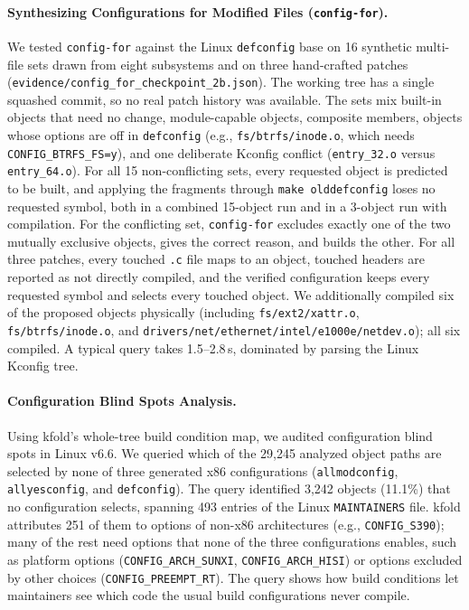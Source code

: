 \documentclass[acmsmall]{acmart}
\newcommand{\tool}{\textsf{kfold}\xspace}
\newcounter{none}
\begin{document}
\paragraph{Synthesizing Configurations for Modified Files (\texttt{config-for}).}
We tested \texttt{config-for} against the Linux \texttt{defconfig} base on 16 synthetic multi-file sets drawn from eight subsystems and on three hand-crafted patches (\texttt{evidence/config\_for\_checkpoint\_2b.json}).
The working tree has a single squashed commit, so no real patch history was available.
The sets mix built-in objects that need no change, module-capable objects, composite members, objects whose options are off in \texttt{defconfig} (e.g., \texttt{fs/btrfs/inode.o}, which needs \texttt{CONFIG\_BTRFS\_FS=y}), and one deliberate Kconfig conflict (\texttt{entry\_32.o} versus \texttt{entry\_64.o}).
For all 15 non-conflicting sets, every requested object is predicted to be built, and applying the fragments through \texttt{make olddefconfig} loses no requested symbol, both in a combined 15-object run and in a 3-object run with compilation.
For the conflicting set, \texttt{config-for} excludes exactly one of the two mutually exclusive objects, gives the correct reason, and builds the other.
For all three patches, every touched \texttt{.c} file maps to an object, touched headers are reported as not directly compiled, and the verified configuration keeps every requested symbol and selects every touched object.
We additionally compiled six of the proposed objects physically (including \texttt{fs/ext2/xattr.o}, \texttt{fs/btrfs/inode.o}, and \texttt{drivers/net/ethernet/intel/e1000e/netdev.o}); all six compiled.
A typical query takes 1.5--2.8\,s, dominated by parsing the Linux Kconfig tree.

\paragraph{Configuration Blind Spots Analysis.}
Using \tool's whole-tree build condition map, we audited configuration blind spots in Linux v6.6.
We queried which of the 29,245 analyzed object paths are selected by none of three generated x86 configurations (\texttt{allmodconfig}, \texttt{allyesconfig}, and \texttt{defconfig}).
The query identified 3,242 objects (11.1\%) that no configuration selects, spanning 493 entries of the Linux \texttt{MAINTAINERS} file.
\tool attributes 251 of them to options of non-x86 architectures (e.g., \texttt{CONFIG\_S390}); many of the rest need options that none of the three configurations enables, such as platform options (\texttt{CONFIG\_ARCH\_SUNXI}, \texttt{CONFIG\_ARCH\_HISI}) or options excluded by other choices (\texttt{CONFIG\_PREEMPT\_RT}).
The query shows how build conditions let maintainers see which code the usual build configurations never compile.
\end{document}
